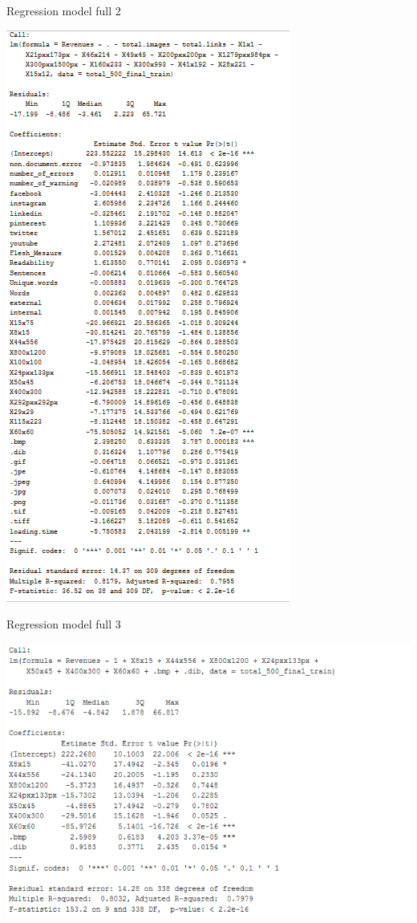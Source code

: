 \documentclass{article}
\begin{document}
\begin{table}[H]
\centering
\caption{Regression model full 2}\label{d :r :2}
\begin{center}
\includegraphics[scale=0.8]{../R/photos/69_full2.PNG}   \\
\end{center}
\end{table}


\begin{table}[H]
\centering
\caption{Regression model full 3}\label{d :r :3}
\begin{center}
\includegraphics[scale=0.6]{../R/photos/72_full3.PNG}   \\
\end{center}
\end{table}
\end{document}
